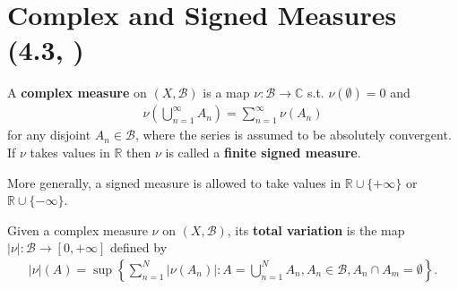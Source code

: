 \section{Complex and Signed Measures \tiny{(4.3, \cite{Gerald_Teschl})}}
\begin{definition}
    A \textbf{complex measure} on \(\left(X,\mathscr{B}\right)\) is a map \(\nu:\mathscr{B}\rightarrow \mathbb{C}\) s.t. 
    \(\nu(\emptyset)=0\) and
    \begin{align*}
        \nu\left(\bigcup\limits_{n=1}^{\infty}A_n\right) = \sum\limits_{n=1}^{\infty}\nu(A_n)
    \end{align*}
    for any disjoint \(A_n\in\mathscr{B}\), where the series is assumed to be absolutely convergent. If \(\nu\) takes values in \(\mathbb{R}\) then \(\nu\) is called a \textbf{finite signed measure}.
\end{definition}
\begin{remark}
    More generally, a signed measure is allowed to take values in \(\mathbb{R}\cup\{+\infty\}\) or \(\mathbb{R}\cup\{-\infty\}\).
\end{remark}

    Given a complex measure \(\nu\) on \((X,\mathscr{B})\), its \textbf{total variation} is the map \(|\nu|:\mathscr{B}\rightarrow[0,+\infty]\) defined by
    \begin{align*}
        |\nu|(A) = \sup\left\{\sum\limits_{n=1}^{N}|\nu(A_n)|:A=\bigcup\limits_{n=1}^{N}A_n, A_n\in\mathscr{B}, A_n\cap A_m = \emptyset\right\}.
    \end{align*}

